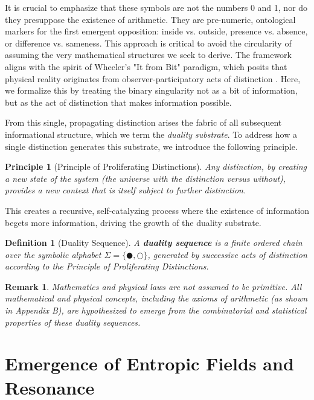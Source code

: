 \documentclass[12pt, a4paper]{article}
\newtheorem{definition}{Definition}[section]
\newtheorem{principle}{Principle}[section]
\newtheorem*{remark}{Remark}
\begin{document}
It is crucial to emphasize that these symbols are not the numbers 0 and 1, nor do they presuppose the existence of arithmetic. They are pre-numeric, ontological markers for the first emergent opposition: inside vs. outside, presence vs. absence, or difference vs. sameness. This approach is critical to avoid the circularity of assuming the very mathematical structures we seek to derive. The framework aligns with the spirit of Wheeler's "It from Bit" paradigm, which posits that physical reality originates from observer-participatory acts of distinction \cite{Wheeler1990}. Here, we formalize this by treating the binary singularity not as a bit of information, but as the act of distinction that makes information possible.

From this single, propagating distinction arises the fabric of all subsequent informational structure, which we term the \emph{duality substrate}. To address how a single distinction generates this substrate, we introduce the following principle.
\begin{principle}[Principle of Proliferating Distinctions]
Any distinction, by creating a new state of the system (the universe with the distinction versus without), provides a new context that is itself subject to further distinction.
\end{principle}
This creates a recursive, self-catalyzing process where the existence of information begets more information, driving the growth of the duality substrate.

\begin{definition}[Duality Sequence]
A \textbf{duality sequence} is a finite ordered chain over the symbolic alphabet $\Sigma = \{\CIRCLE, \Circle\}$, generated by successive acts of distinction according to the Principle of Proliferating Distinctions.
\end{definition}

\begin{remark}
Mathematics and physical laws are not assumed to be primitive. All mathematical and physical concepts, including the axioms of arithmetic (as shown in Appendix B), are hypothesized to emerge from the combinatorial and statistical properties of these duality sequences.
\end{remark}

\section{Emergence of Entropic Fields and Resonance}
\label{sec:emergence}
\end{document}
